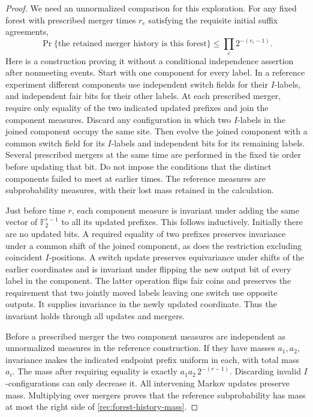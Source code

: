 \begin{proof}
We need an unnormalized comparison for this exploration.
For any fixed forest with prescribed merger times $r_e$
satisfying the requisite initial suffix agreements,
\begin{equation}\label{rec:forest-history-mass}
 \Pr\{\text{the retained merger history is this forest}\}
 \le\prod_e2^{-(r_e-1)}.
\end{equation}
Here is a construction proving it without a conditional
independence assertion after nonmeeting events.
Start with one component for every label.  In a reference
experiment different components use independent switch
fields for their $I$-labels, and independent fair bits for
their other labels.  At each prescribed merger, require
only equality of the two indicated updated prefixes and
join the component measures.  Discard any configuration in
which two $I$-labels in the joined component occupy the same
site.  Then evolve the joined component with a common switch
field for its $I$-labels and independent bits for its remaining
labels.  Several prescribed mergers at the same time are
performed in the fixed tie order before updating that bit.
Do not impose the conditions that the distinct components
failed to meet at earlier times.  The reference measures
are subprobability measures, with their lost mass retained
in the calculation.

Just before time $r$, each component measure is invariant
under adding the same vector of $\mathbb F_2^{r-1}$ to all
its updated prefixes.  This follows inductively.
Initially there are no updated bits.  A required equality
of two prefixes preserves invariance under a common shift
of the joined component, as does the restriction excluding
coincident $I$-positions.  A switch update preserves
equivariance under shifts of the earlier coordinates and
is invariant under flipping the new output bit of every
label in the component.  The latter operation flips fair
coins and preserves the requirement that two jointly moved
labels leaving one switch use opposite outputs.
It supplies invariance in the newly updated coordinate.
Thus the invariant holds through all updates and mergers.

Before a prescribed merger the two component measures are
independent as unnormalized measures in the reference
construction.  If they have masses $a_1,a_2$, invariance
makes the indicated endpoint prefix uniform in each,
with total mass $a_i$.  The mass after requiring equality
is exactly $a_1a_2\,2^{-(r-1)}$.
Discarding invalid $I$-configurations can only decrease it.
All intervening Markov updates preserve mass.
Multiplying over mergers proves that the reference
subprobability has mass at most the right side of
\eqref{rec:forest-history-mass}.


\end{proof}
